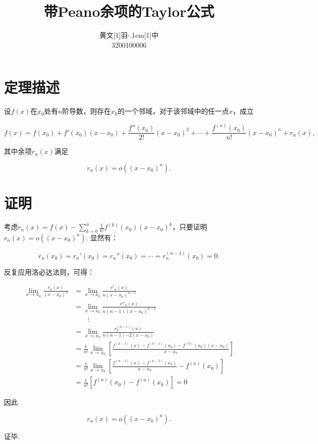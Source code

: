 \documentclass[UTF8]{ctexart}
\title{\textbf{带Peano余项的Taylor公式}}
\author{\CJKfamily{kai} 黄文\hbox{\scalebox{0.6}[1]{羽}\kern-.1em\scalebox{0.5}[1]{中}}\\3200100006}
\begin{document}
\maketitle

\section{定理描述}

设$f(x)$在$x_0$处有$n$阶导数，则存在$x_0$的一个邻域，对于该邻域中的任一点$x$，成立

\begin{equation}
    f(x)=f(x_0)+f'(x_0)(x-x_0)+\frac{f''(x_0)}{2!}(x-x_0)^2+\cdots+\frac{f^{(n)}(x_0)}{n!}(x-x_0)^n+r_n(x),
\end{equation}

其中余项$r_n(x)$满足

\begin{equation}
    r_n(x)=o((x-x_0)^n).
\end{equation}

\section{证明}

考虑$r_n(x)=f(x)-\sum_{k=0}^n\frac{1}{k!}f^{(k)}(x_0)(x-x_0)^k$，只要证明$r_n(x)=o((x-x_0)^n)$. 显然有：

\begin{equation}
    r_n(x_0)=r_n'(x_0)=r_n''(x_0)=\cdots =r_n^(n-1)(x_0)=0.
\end{equation}

反复应用洛必达法则，可得：

\begin{align*}
   \lim_{x\to x_0} \frac{r_n(x)}{(x-x_0)^n} &= \lim_{x\to x_0} \frac{r'_n(x)}{n(x-x_0)^{n-1}}\\
   &= \lim_{x\to x_0} \frac{r''_n(x)}{n(n-1)(x-x_0)^{n-2}}\\
   & \qquad \vdots\\
   &= \lim_{x\to x_0} \frac{r^{(n-1)}_n(x)}{n(n-1)\cdots 2(x-x_0)} \\
   &= \frac{1}{n!}\lim_{x\to x_0} \left[\frac{f^{(n-1)}(x)-f^{(n-1)}(x_0)-f^{(n)}(x_0)(x-x_0)}{x-x_0}\right]\\
   &= \frac{1}{n!} \lim_{x\to x_0} \left[\frac{f^{(n-1)}(x)-f^{(n-1)}(x_0)}{x-x_0}-f^{(n)}(x_0)\right]\\
   &=\frac{1}{n!}\left[f^{(n)}(x_0)-f^{(n)}(x_0)\right]=0
\end{align*}

因此

\begin{equation*}
    r_n(x) = o((x-x_0)^n).
\end{equation*}

证毕.
\end{document}
